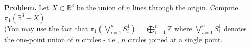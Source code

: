 \documentclass[a4paper]{article}
\theoremstyle{plain}%
\theoremstyle{definition}
\theoremstyle{remark}
\begin{document}
\textbf{Problem.} Let $X \subset \mathbb{R}^3$ be the union of $n$ lines
through the origin. Compute $\pi_1 \left( \mathbb{R}^3 - X \right) $.\\
(You may
use the fact that $\pi_1 \left( \bigvee_{i = 1}^{n} S_i^{1} \right) =
\bigoplus_{i = 1}^{n} \mathbb{Z}$ where $\bigvee_{i=1}^{n}S_i^{1}$ denotes
the one-point union of $n$ circles - i.e., $n$ circles joined at a single
point.




    
\end{document}
